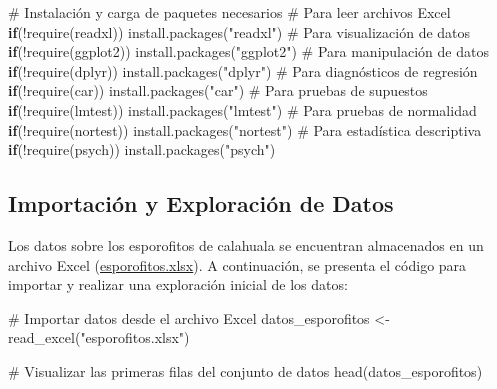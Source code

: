 \documentclass[
  spanish,
  a4paper,
  DIV=11,
  numbers=noendperiod,
  onepage,
  openany]{scrreprt}
\newenvironment{Shaded}{\begin{snugshade}}{\end{snugshade}}
\newcommand{\CommentTok}[1]{\textcolor[rgb]{0.37,0.37,0.37}{#1}}
\newcommand{\ControlFlowTok}[1]{\textcolor[rgb]{0.00,0.23,0.31}{\textbf{#1}}}
\newcommand{\FunctionTok}[1]{\textcolor[rgb]{0.28,0.35,0.67}{#1}}
\newcommand{\NormalTok}[1]{\textcolor[rgb]{0.00,0.23,0.31}{#1}}
\newcommand{\OtherTok}[1]{\textcolor[rgb]{0.00,0.23,0.31}{#1}}
\newcommand{\SpecialCharTok}[1]{\textcolor[rgb]{0.37,0.37,0.37}{#1}}
\newcommand{\StringTok}[1]{\textcolor[rgb]{0.13,0.47,0.30}{#1}}
\begin{document}
\begin{Shaded}
\begin{Highlighting}[]
\CommentTok{\# Instalación y carga de paquetes necesarios}
\CommentTok{\# Para leer archivos Excel}
\ControlFlowTok{if}\NormalTok{(}\SpecialCharTok{!}\FunctionTok{require}\NormalTok{(readxl)) }\FunctionTok{install.packages}\NormalTok{(}\StringTok{"readxl"}\NormalTok{)}
\CommentTok{\# Para visualización de datos}
\ControlFlowTok{if}\NormalTok{(}\SpecialCharTok{!}\FunctionTok{require}\NormalTok{(ggplot2)) }\FunctionTok{install.packages}\NormalTok{(}\StringTok{"ggplot2"}\NormalTok{)     }
\CommentTok{\# Para manipulación de datos}
\ControlFlowTok{if}\NormalTok{(}\SpecialCharTok{!}\FunctionTok{require}\NormalTok{(dplyr)) }\FunctionTok{install.packages}\NormalTok{(}\StringTok{"dplyr"}\NormalTok{)         }
\CommentTok{\# Para diagnósticos de regresión}
\ControlFlowTok{if}\NormalTok{(}\SpecialCharTok{!}\FunctionTok{require}\NormalTok{(car)) }\FunctionTok{install.packages}\NormalTok{(}\StringTok{"car"}\NormalTok{)              }
\CommentTok{\# Para pruebas de supuestos}
\ControlFlowTok{if}\NormalTok{(}\SpecialCharTok{!}\FunctionTok{require}\NormalTok{(lmtest)) }\FunctionTok{install.packages}\NormalTok{(}\StringTok{"lmtest"}\NormalTok{)    }
\CommentTok{\# Para pruebas de normalidad}
\ControlFlowTok{if}\NormalTok{(}\SpecialCharTok{!}\FunctionTok{require}\NormalTok{(nortest)) }\FunctionTok{install.packages}\NormalTok{(}\StringTok{"nortest"}\NormalTok{)    }
\CommentTok{\# Para estadística descriptiva}
\ControlFlowTok{if}\NormalTok{(}\SpecialCharTok{!}\FunctionTok{require}\NormalTok{(psych)) }\FunctionTok{install.packages}\NormalTok{(}\StringTok{"psych"}\NormalTok{)    }
\end{Highlighting}
\end{Shaded}

\subsection{Importación y Exploración de
Datos}\label{importaciuxf3n-y-exploraciuxf3n-de-datos}

Los datos sobre los esporofitos de calahuala se encuentran almacenados
en un archivo Excel
(\href{https://docs.google.com/spreadsheets/d/1HTODUlwTvRYYEiTsP7rQRUvlOgll4n6R/edit?usp=sharing&ouid=106152052819657144907&rtpof=true&sd=true}{esporofitos.xlsx}).
A continuación, se presenta el código para importar y realizar una
exploración inicial de los datos:

\begin{Shaded}
\begin{Highlighting}[]
\CommentTok{\# Importar datos desde el archivo Excel}
\NormalTok{datos\_esporofitos }\OtherTok{\textless{}{-}} \FunctionTok{read\_excel}\NormalTok{(}\StringTok{"esporofitos.xlsx"}\NormalTok{)}

\CommentTok{\# Visualizar las primeras filas del conjunto de datos}
\FunctionTok{head}\NormalTok{(datos\_esporofitos)}
\end{Highlighting}
\end{Shaded}
\end{document}
